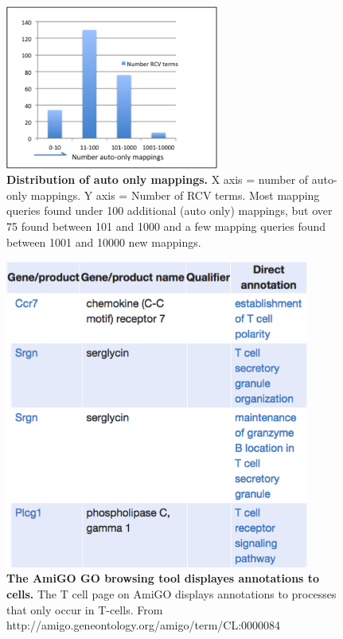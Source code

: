 \documentclass[runningheads,a4paper]{llncs}
\begin{document}
{{\begin{figure}
\centering
\includegraphics[width=70mm]{auto_only.png}
\caption{\textbf{Distribution of auto only mappings.}
X axis = number of auto-only mappings.  Y axis = Number of RCV terms.  Most mapping queries found under 100 additional (auto only) mappings, but over 75 found between 101 and 1000 and a few mapping queries found between 1001 and 10000 new mappings.}
\label{fig:auto_only}
\end{figure}

\begin{figure}
\centering
\includegraphics[width=100mm]{amigo.png}
\caption{\textbf{The AmiGO \ac{GO} browsing tool displayes annotations to cells.}  The  T cell page on AmiGO displays annotations to processes that only occur in T-cells.  From http://amigo.geneontology.org/amigo/term/CL:0000084}
\label{fig:amigo}
\end{figure}


}}
\end{document}
